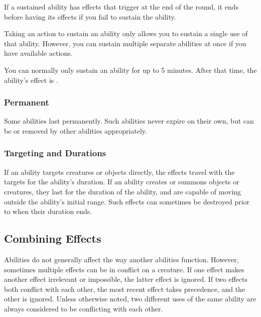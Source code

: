             If a sustained ability has effects that trigger at the end of the round, it ends before having its effects if you fail to sustain the ability.

            Taking an action to sustain an ability only allows you to sustain a single use of that ability.
            However, you can sustain multiple separate abilities at once if you have available actions.

            You can normally only sustain an ability for up to 5 minutes.
            After that time, the ability's effect is .

        \subsubsection{Permanent}
            Some abilities last permanently.
            Such abilities never expire on their own, but can be  or removed by other abilities appropriately.

        \subsubsection{Targeting and Durations}
            If an ability targets creatures or objects directly, the effects travel with the targets for the ability's duration.
            If an ability creates or summons objects or creatures, they last for the duration of the ability, and are capable of moving outside the ability's initial range.
            Such effects can sometimes be destroyed prior to when their duration ends.

    \subsection{Combining Effects}
        Abilities do not generally affect the way another abilities function.
        However, sometimes multiple effects can be in conflict on a creature.
        If one effect makes another effect irrelevant or impossible, the latter effect is ignored.
        If two effects both conflict with each other, the most recent effect takes precedence, and the other is ignored.
        Unless otherwise noted, two different uses of the same ability are always considered to be conflicting with each other.

